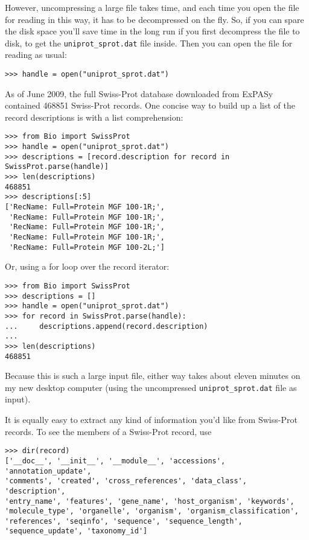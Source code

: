 However, uncompressing a large file takes time, and each time you open the file for reading in this way, it has to be decompressed on the fly.  So, if you can spare the disk space you'll save time in the long run if you first decompress the file to disk, to get the \verb|uniprot_sprot.dat| file inside.  Then you can open the file for reading as usual:

\begin{verbatim}
>>> handle = open("uniprot_sprot.dat")
\end{verbatim}

As of June 2009, the full Swiss-Prot database downloaded from ExPASy contained 468851 Swiss-Prot records.  One concise way to build up a list of the record descriptions is with a list comprehension:
\begin{verbatim}
>>> from Bio import SwissProt
>>> handle = open("uniprot_sprot.dat")
>>> descriptions = [record.description for record in SwissProt.parse(handle)]
>>> len(descriptions)
468851
>>> descriptions[:5]
['RecName: Full=Protein MGF 100-1R;',
 'RecName: Full=Protein MGF 100-1R;',
 'RecName: Full=Protein MGF 100-1R;',
 'RecName: Full=Protein MGF 100-1R;',
 'RecName: Full=Protein MGF 100-2L;']

\end{verbatim}

Or, using a for loop over the record iterator:
\begin{verbatim}
>>> from Bio import SwissProt
>>> descriptions = []
>>> handle = open("uniprot_sprot.dat")
>>> for record in SwissProt.parse(handle):
...     descriptions.append(record.description)
...
>>> len(descriptions)
468851
\end{verbatim}

Because this is such a large input file, either way takes about eleven minutes on my new desktop computer (using the uncompressed \verb|uniprot_sprot.dat| file as input).

It is equally easy to extract any kind of information you'd like from Swiss-Prot records. To see the members of a Swiss-Prot record, use
\begin{verbatim}
>>> dir(record)
['__doc__', '__init__', '__module__', 'accessions', 'annotation_update',
'comments', 'created', 'cross_references', 'data_class', 'description',
'entry_name', 'features', 'gene_name', 'host_organism', 'keywords',
'molecule_type', 'organelle', 'organism', 'organism_classification',
'references', 'seqinfo', 'sequence', 'sequence_length',
'sequence_update', 'taxonomy_id']
\end{verbatim}

